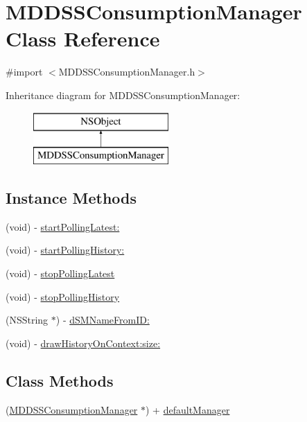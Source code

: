 \hypertarget{interface_m_d_d_s_s_consumption_manager}{\section{M\-D\-D\-S\-S\-Consumption\-Manager Class Reference}
\label{interface_m_d_d_s_s_consumption_manager}
}


{\ttfamily \#import $<$M\-D\-D\-S\-S\-Consumption\-Manager.\-h$>$}

Inheritance diagram for M\-D\-D\-S\-S\-Consumption\-Manager\-:\begin{figure}[H]
\begin{center}
\leavevmode
\includegraphics[height=2.000000cm]{interface_m_d_d_s_s_consumption_manager}
\end{center}
\end{figure}
\subsection*{Instance Methods}
\begin{DoxyCompactItemize}
\item 
(void) -\/ \hyperlink{interface_m_d_d_s_s_consumption_manager_aacfaedb3584a13fbeda5f2cf67223ce8}{start\-Polling\-Latest\-:}
\item 
(void) -\/ \hyperlink{interface_m_d_d_s_s_consumption_manager_a9a21d799de7fc9069558a53c73cdfb9c}{start\-Polling\-History\-:}
\item 
(void) -\/ \hyperlink{interface_m_d_d_s_s_consumption_manager_af253ad6e5f08008ceec0a247a27b2526}{stop\-Polling\-Latest}
\item 
(void) -\/ \hyperlink{interface_m_d_d_s_s_consumption_manager_a5c9bf787dd26bf05d1185cf06412ba32}{stop\-Polling\-History}
\item 
(N\-S\-String $\ast$) -\/ \hyperlink{interface_m_d_d_s_s_consumption_manager_a4347a6f14215e842e5629072c1a883c4}{d\-S\-M\-Name\-From\-I\-D\-:}
\item 
(void) -\/ \hyperlink{interface_m_d_d_s_s_consumption_manager_ac4d5086c7cf8ce63e8e3996ba5e841ea}{draw\-History\-On\-Context\-:size\-:}
\end{DoxyCompactItemize}
\subsection*{Class Methods}
\begin{DoxyCompactItemize}
\item 
(\hyperlink{interface_m_d_d_s_s_consumption_manager}{M\-D\-D\-S\-S\-Consumption\-Manager} $\ast$) + \hyperlink{interface_m_d_d_s_s_consumption_manager_ac7a7890115eff0ddaf1e4022d474f4bc}{default\-Manager}
\end{DoxyCompactItemize}
